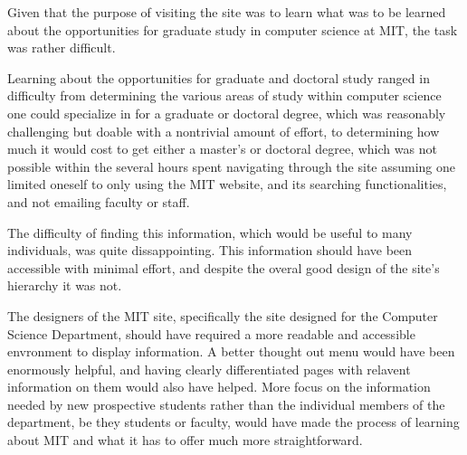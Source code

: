 Given that the purpose of visiting the site was to learn what was to be learned about the
opportunities for graduate study in computer science at MIT, the task was rather difficult.

Learning about the opportunities for graduate and doctoral study ranged in difficulty from
determining the various areas of study within computer science one could specialize in
for a graduate or doctoral degree, which was reasonably challenging but doable with a
nontrivial amount of effort, to determining how much it would cost to get either a master's
or doctoral degree, which was not possible within the several hours spent navigating through
the site assuming one limited oneself to only using the MIT website, and its searching
functionalities, and not emailing faculty or staff.

The difficulty of finding this information, which would be useful to many individuals, was
quite dissappointing. This information should have been accessible with minimal effort, and
despite the overal good design of the site's hierarchy it was not.

The designers of the MIT site, specifically the site designed for the Computer Science Department,
should have required a more readable and accessible envronment to display information. A better
thought out menu would have been enormously helpful, and having clearly differentiated pages with
relavent information on them would also have helped. More focus on the information needed by new
prospective students rather than the individual members of the department, be they students or
faculty, would have made the process of learning about MIT and what it has to offer much more
straightforward.

